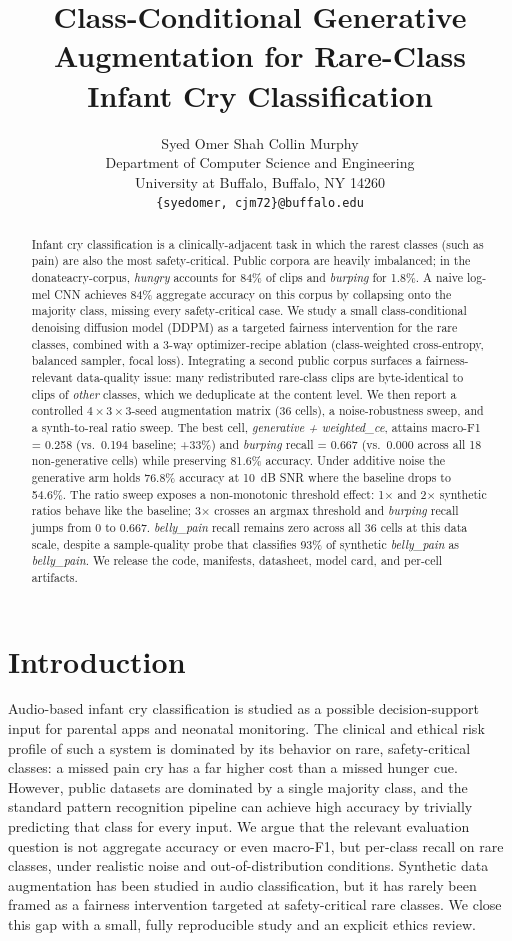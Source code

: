 \documentclass[final]{article}
\title{Class-Conditional Generative Augmentation for Rare-Class Infant Cry Classification}
\author{
  Syed Omer Shah \quad Collin Murphy \\
  Department of Computer Science and Engineering \\
  University at Buffalo, Buffalo, NY 14260 \\
  \texttt{\{syedomer, cjm72\}@buffalo.edu}
}
\begin{document}
\maketitle

\begin{abstract}
Infant cry classification is a clinically-adjacent task in which the rarest classes (such as pain) are also the most safety-critical. Public corpora are heavily imbalanced; in the donateacry-corpus, \textit{hungry} accounts for 84\% of clips and \textit{burping} for 1.8\%. A naive log-mel CNN achieves 84\% aggregate accuracy on this corpus by collapsing onto the majority class, missing every safety-critical case. We study a small class-conditional denoising diffusion model (DDPM) as a targeted fairness intervention for the rare classes, combined with a 3-way optimizer-recipe ablation (class-weighted cross-entropy, balanced sampler, focal loss). Integrating a second public corpus surfaces a fairness-relevant data-quality issue: many redistributed rare-class clips are byte-identical to clips of \emph{other} classes, which we deduplicate at the content level. We then report a controlled $4 \times 3 \times 3$-seed augmentation matrix (36 cells), a noise-robustness sweep, and a synth-to-real ratio sweep. The best cell, \textit{generative + weighted\_ce}, attains macro-F1 = 0.258 (vs.\ 0.194 baseline; +33\%) and \textit{burping} recall = 0.667 (vs.\ 0.000 across all 18 non-generative cells) while preserving 81.6\% accuracy. Under additive noise the generative arm holds 76.8\% accuracy at 10~dB SNR where the baseline drops to 54.6\%. The ratio sweep exposes a non-monotonic threshold effect: 1$\times$ and 2$\times$ synthetic ratios behave like the baseline; 3$\times$ crosses an argmax threshold and \textit{burping} recall jumps from 0 to 0.667. \textit{belly\_pain} recall remains zero across all 36 cells at this data scale, despite a sample-quality probe that classifies 93\% of synthetic \textit{belly\_pain} as \textit{belly\_pain}. We release the code, manifests, datasheet, model card, and per-cell artifacts.
\end{abstract}

\section{Introduction}\label{sec:intro}
Audio-based infant cry classification is studied as a possible decision-support input for parental apps and neonatal monitoring. The clinical and ethical risk profile of such a system is dominated by its behavior on rare, safety-critical classes: a missed pain cry has a far higher cost than a missed hunger cue. However, public datasets are dominated by a single majority class, and the standard pattern recognition pipeline can achieve high accuracy by trivially predicting that class for every input. We argue that the relevant evaluation question is not aggregate accuracy or even macro-F1, but per-class recall on rare classes, under realistic noise and out-of-distribution conditions. Synthetic data augmentation has been studied in audio classification, but it has rarely been framed as a fairness intervention targeted at safety-critical rare classes. We close this gap with a small, fully reproducible study and an explicit ethics review.
\end{document}
